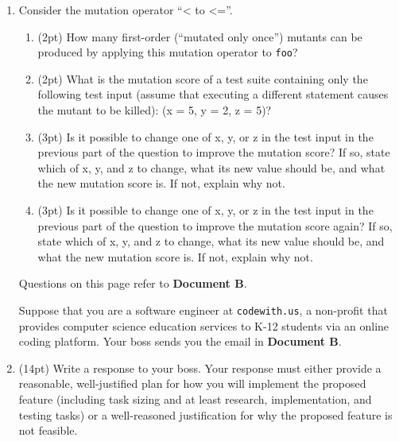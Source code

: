 \documentclass{report}
\newif\ifkey
\newcommand{\answershort}[1]{\ifkey\color{red}\underline{\textbf{#1}}\color{black}\else\underline{\hspace{3in}}\fi\xspace}
\newcommand{\answervshort}[1]{\ifkey\color{red}\underline{\textbf{#1}}\color{black}\else\underline{\hspace{1in}}\fi\xspace}
\newcommand{\answerlong}[1]{\ifkey\color{red}\textbf{#1}\color{black}\else\vspace{0.5in}\fi\xspace}
\newcommand*{\pts}[1]{\addtocounter{points}{#1}(#1pt)}
\begin{document}
\begin{spacing}{1.4}
\begin{enumerate}[leftmargin=*]
  \item \label{el1} Consider the mutation operator ``< to <=''.
    \begin{enumerate}
    \item \pts{2} How many first-order (``mutated only once'') mutants can be produced by applying this mutation operator
    to \lstinline$foo$?\\ \answervshort{2}
    \item \pts{2} What is the mutation score of a test suite containing only the following test input (assume that executing a different statement causes the mutant to be killed):
    (x = 5, y = 2, z = 5)?\\ \answershort{0\%}
    \item \pts{3} Is it possible to change one of x, y, or z in the test input in the previous part of the question to improve the mutation score?
    If so, state which of x, y, and z to change, what its new value should be, and what the new mutation score is. If not, explain
    why not. \\
    \answerlong{z = 6 changes the mutation score to 50\%}
    \item \pts{3} Is it possible to change one of x, y, or z in the test input in the previous part of the question to improve the mutation score again?
    If so, state which of x, y, and z to change, what its new value should be, and what the new mutation score is. If not, explain
    why not. \\
    \answerlong{It is not, because the second mutant is an equivalent mutant.}
    \end{enumerate}

    \newpage

    Questions on this page refer to \textbf{Document B}.

    Suppose that you are a software engineer at \lstinline{codewith.us}, a non-profit that provides computer science education
    services to K-12 students via an online coding platform. Your boss sends you the email in \textbf{Document B}.

  \item \label{lastQuestion} \pts{14} Write a response to your boss. Your response must either provide a reasonable, well-justified plan
    for how you will implement the proposed feature (including task sizing and at least research, implementation, and testing tasks)
    or a well-reasoned justification for why the proposed feature is not feasible.

    \answerlong{The proposed feature is an instance of the halting problem, and Mr. Rice's insistence that
      you get the correct answer 100\% of the time means that it is impossible to implement the feature as described.
    Correct answers must be phrased as an email, and use a polite but firm tone.}


\end{enumerate}
\end{spacing}
\end{document}
